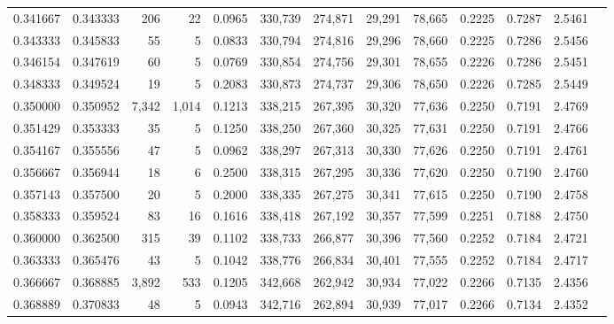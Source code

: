 \begin{tabular}{rrrrrrrrrrrrr}
0.341667 & 0.343333 &    206 &     22 &                                     0.0965 & 330,739 & 274,871 &  29,291 &  78,665 & 0.2225 & 0.7287 & 2.5461 \\
0.343333 & 0.345833 &     55 &      5 &                                     0.0833 & 330,794 & 274,816 &  29,296 &  78,660 & 0.2225 & 0.7286 & 2.5456 \\
0.346154 & 0.347619 &     60 &      5 &                                     0.0769 & 330,854 & 274,756 &  29,301 &  78,655 & 0.2226 & 0.7286 & 2.5451 \\
0.348333 & 0.349524 &     19 &      5 &                                     0.2083 & 330,873 & 274,737 &  29,306 &  78,650 & 0.2226 & 0.7285 & 2.5449 \\
0.350000 & 0.350952 &  7,342 &  1,014 &                                     0.1213 & 338,215 & 267,395 &  30,320 &  77,636 & 0.2250 & 0.7191 & 2.4769 \\
0.351429 & 0.353333 &     35 &      5 &                                     0.1250 & 338,250 & 267,360 &  30,325 &  77,631 & 0.2250 & 0.7191 & 2.4766 \\
0.354167 & 0.355556 &     47 &      5 &                                     0.0962 & 338,297 & 267,313 &  30,330 &  77,626 & 0.2250 & 0.7191 & 2.4761 \\
0.356667 & 0.356944 &     18 &      6 &                                     0.2500 & 338,315 & 267,295 &  30,336 &  77,620 & 0.2250 & 0.7190 & 2.4760 \\
0.357143 & 0.357500 &     20 &      5 &                                     0.2000 & 338,335 & 267,275 &  30,341 &  77,615 & 0.2250 & 0.7190 & 2.4758 \\
0.358333 & 0.359524 &     83 &     16 &                                     0.1616 & 338,418 & 267,192 &  30,357 &  77,599 & 0.2251 & 0.7188 & 2.4750 \\
0.360000 & 0.362500 &    315 &     39 &                                     0.1102 & 338,733 & 266,877 &  30,396 &  77,560 & 0.2252 & 0.7184 & 2.4721 \\
0.363333 & 0.365476 &     43 &      5 &                                     0.1042 & 338,776 & 266,834 &  30,401 &  77,555 & 0.2252 & 0.7184 & 2.4717 \\
0.366667 & 0.368885 &  3,892 &    533 &                                     0.1205 & 342,668 & 262,942 &  30,934 &  77,022 & 0.2266 & 0.7135 & 2.4356 \\
0.368889 & 0.370833 &     48 &      5 &                                     0.0943 & 342,716 & 262,894 &  30,939 &  77,017 & 0.2266 & 0.7134 & 2.4352 \\

\end{tabular}
